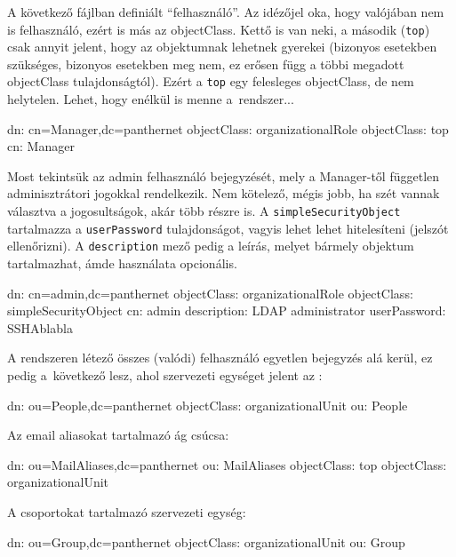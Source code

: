 \noindent A következő  fájlban definiált ``felhasználó''. Az idézőjel oka, hogy valójában nem is
felhasználó, ezért is más az objectClass. Kettő is van neki, a második (\texttt{top}) csak annyit jelent, hogy az
objektumnak lehetnek gyerekei (bizonyos esetekben szükséges, bizonyos esetekben meg nem, ez erősen függ a többi megadott
objectClass tulajdonságtól). Ezért a \texttt{top} egy felesleges objectClass, de nem helytelen. Lehet, hogy enélkül is
menne a~rendszer...


\begin{VerbExample}
dn: cn=Manager,dc=panthernet
objectClass: organizationalRole
objectClass: top
cn: Manager
\end{VerbExample}

\noindent Most tekintsük az admin felhasználó bejegyzését, mely a Manager-től független adminisztrátori jogokkal
rendelkezik. Nem kötelező, mégis jobb, ha szét vannak választva a jogosultságok, akár több részre is. A
\texttt{simpleSecurityObject} tartalmazza a \texttt{userPassword} tulajdonságot, vagyis lehet lehet hitelesíteni
(jelszót ellenőrizni). A \texttt{description} mező pedig a leírás, melyet bármely objektum tartalmazhat, ámde használata
opcionális.


\begin{VerbExample}
dn: cn=admin,dc=panthernet
objectClass: organizationalRole
objectClass: simpleSecurityObject
cn: admin
description: LDAP administrator
userPassword: {SSHA}blabla
\end{VerbExample}


\noindent A rendszeren létező összes (valódi) felhasználó egyetlen bejegyzés alá kerül, ez pedig a~következő lesz, ahol
szervezeti egységet jelent az :

\begin{VerbExample}
dn: ou=People,dc=panthernet
objectClass: organizationalUnit
ou: People  
\end{VerbExample}


\noindent Az email aliasokat tartalmazó ág csúcsa:

\begin{VerbExample}
dn: ou=MailAliases,dc=panthernet
ou: MailAliases
objectClass: top
objectClass: organizationalUnit
\end{VerbExample}


\noindent A csoportokat tartalmazó szervezeti egység:

\begin{VerbExample}
dn: ou=Group,dc=panthernet
objectClass: organizationalUnit
ou: Group
\end{VerbExample}



